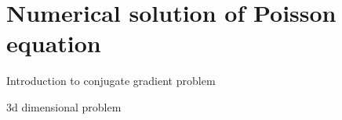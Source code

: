 \chapter{Numerical solution of Poisson equation}

Introduction to conjugate gradient problem

3d dimensional problem